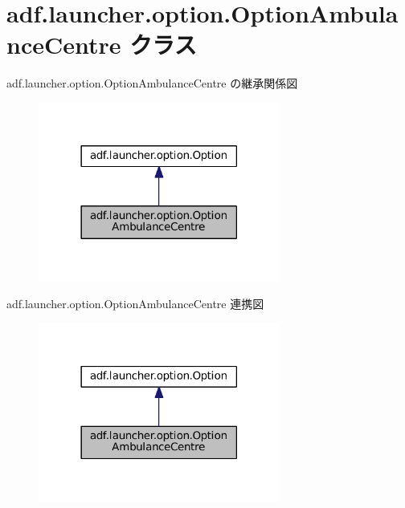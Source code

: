 \hypertarget{classadf_1_1launcher_1_1option_1_1OptionAmbulanceCentre}{}\section{adf.\+launcher.\+option.\+Option\+Ambulance\+Centre クラス}
\label{classadf_1_1launcher_1_1option_1_1OptionAmbulanceCentre}


adf.\+launcher.\+option.\+Option\+Ambulance\+Centre の継承関係図
\nopagebreak
\begin{figure}[H]
\begin{center}
\leavevmode
\includegraphics[width=225pt]{classadf_1_1launcher_1_1option_1_1OptionAmbulanceCentre__inherit__graph}
\end{center}
\end{figure}


adf.\+launcher.\+option.\+Option\+Ambulance\+Centre 連携図
\nopagebreak
\begin{figure}[H]
\begin{center}
\leavevmode
\includegraphics[width=225pt]{classadf_1_1launcher_1_1option_1_1OptionAmbulanceCentre__coll__graph}
\end{center}
\end{figure}
